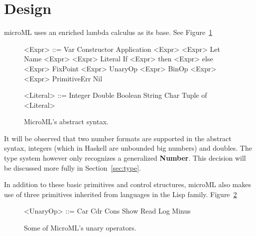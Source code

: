 \documentclass[12pt, a4paper]{report}
\begin{document}
\section{Design}
microML uses an enriched lambda calculus as its base. See Figure~\ref{fig:syntax}

\begin{figure}
    \begin{minipage}[t]{0.5\textwidth}
        \begin{grammar}
            <Expr> ::= Var
            \alt{} Constructor 
            \alt{} Application <Expr> <Expr>
            \alt{} Let Name <Expr> <Expr>
            \alt{} Literal 
            \alt{} If <Expr> then <Expr> else <Expr>
            \alt{} FixPoint <Expr>
            \alt{} UnaryOp <Expr>
            \alt{} BinOp <Expr> <Expr>
            \alt{} PrimitiveErr 
            \alt{} Nil
        \end{grammar}
    \end{minipage}
    \begin{minipage}[t]{0.5\textwidth}
        \begin{grammar}
            <Literal> ::= Integer
            \alt{} Double
            \alt{} Boolean
            \alt{} String
            \alt{} Char
            \alt{} Tuple of <Literal>
        \end{grammar}
    \end{minipage}
    \caption{MicroML's abstract syntax.}
\label{fig:syntax}
\end{figure}

It will be observed that two number formats are supported in the abstract syntax, integers (which in
Haskell are unbounded big numbers) and doubles. The type system however only recognizes a
generalized \textbf{Number}. This decision will be discussed more fully in Section~\ref{sec:type}.

In addition to these basic primitives and control structures, microML also makes use of three
primitives inherited from languages in the Lisp family. Figure~\ref{fig:unary}

\begin{figure}
        \begin{grammar}
            <UnaryOp> ::= Car 
            \alt{} Cdr
            \alt{} Cons
            \alt{} Show
            \alt{} Read
            \alt{} Log
            \alt{} Minus
        \end{grammar}
    \caption{Some of MicroML's unary operators.}
\label{fig:unary}
\end{figure}
\end{document}
